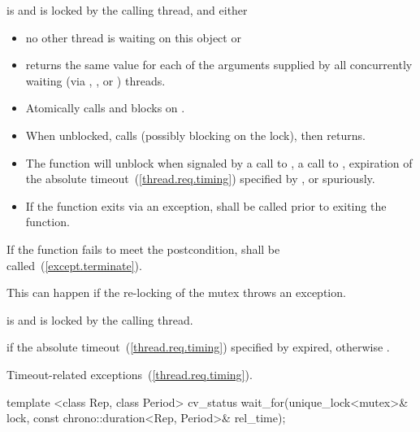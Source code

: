 \begin{itemdescr}
\pnum
\precondition {} is  and 
is locked by the calling thread, and either
\begin{itemize}
\item no other thread is waiting on this  object or
\item {} returns the same value for each of the 
arguments supplied by all concurrently waiting (via ,
, or ) threads.
\end{itemize}

\pnum
\effects
\begin{itemize}
\item
Atomically calls  and blocks on .

\item
When unblocked, calls  (possibly blocking on the lock), then returns.

\item
The function will unblock when signaled by a call to , a call to ,
expiration of the absolute timeout~(\ref{thread.req.timing}) specified by ,
or spuriously.

\item
If the function exits via an exception,  shall be called prior to exiting the function.
\end{itemize}

\pnum
\remarks
If the function fails to meet the postcondition, 
shall be called~(\ref{except.terminate}).
\begin{note} This can happen if the re-locking of the mutex throws an exception. \end{note}

\pnum
\postcondition {} is  and 
is locked by the calling thread.

\pnum
\returns {} if
the absolute timeout~(\ref{thread.req.timing}) specified by  expired,
otherwise .

\pnum\throws Timeout-related
exceptions~(\ref{thread.req.timing}).

\end{itemdescr}

%
%
\begin{itemdecl}
template <class Rep, class Period>
  cv_status wait_for(unique_lock<mutex>& lock,
                     const chrono::duration<Rep, Period>& rel_time);
\end{itemdecl}

